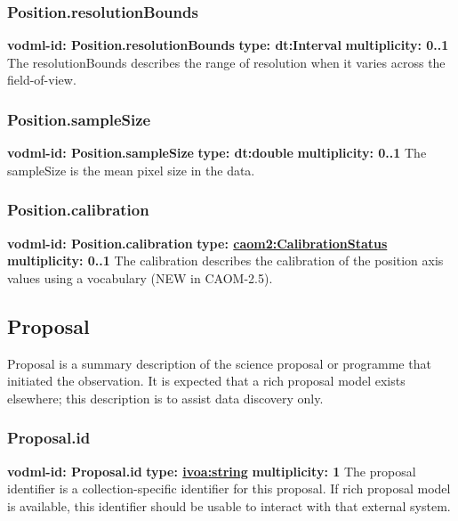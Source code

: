     \subsubsection{Position.resolutionBounds}
      \textbf{vodml-id: Position.resolutionBounds} \newline
      \textbf{type: dt:Interval} \newline
      \textbf{multiplicity: 0..1} \newline
      The resolutionBounds describes the range of resolution when it varies across the field-of-view.

    \subsubsection{Position.sampleSize}
      \textbf{vodml-id: Position.sampleSize} \newline
      \textbf{type: dt:double} \newline
      \textbf{multiplicity: 0..1} \newline
      The sampleSize is the mean pixel size in the data.

    \subsubsection{Position.calibration}
      \textbf{vodml-id: Position.calibration} \newline
      \textbf{type: \hyperref[sect:CalibrationStatus]{caom2:CalibrationStatus}} \newline
      \textbf{multiplicity: 0..1} \newline
      The calibration describes the calibration of the position axis values using a vocabulary (NEW in CAOM-2.5).

  \subsection{Proposal}
  \label{sect:Proposal}
    Proposal is a summary description of the science proposal or programme that initiated the observation. It is expected that a rich proposal model exists elsewhere; this description is to assist data discovery only.

    \subsubsection{Proposal.id}
      \textbf{vodml-id: Proposal.id} \newline
      \textbf{type: \hyperref[sect:ivoa]{ivoa:string}} \newline
      \textbf{multiplicity: 1} \newline
      The proposal identifier is a collection-specific identifier for this proposal. If rich proposal model is available, this identifier should be usable to interact with that external system.

